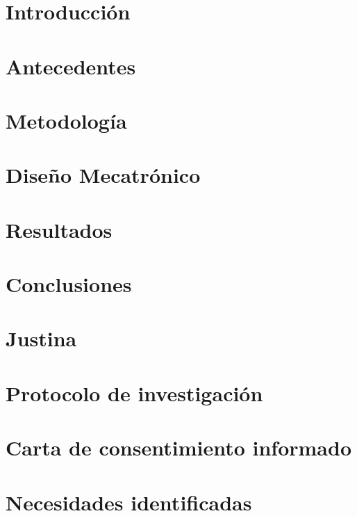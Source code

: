 \documentclass[12pt,twoside]{report}
\begin{document}
\restoregeometry
\newpage
\tableofcontents

\chapter{Introducci\'on}


\chapter{Antecedentes}


\chapter{Metodolog\'ia}


\chapter{Diseño Mecatrónico}


\chapter{Resultados}


\chapter{Conclusiones}


\appendix

\chapter{Justina}


\chapter{Protocolo de investigaci\'on}


\chapter{Carta de consentimiento informado}


\chapter{Necesidades identificadas}

\end{document}
